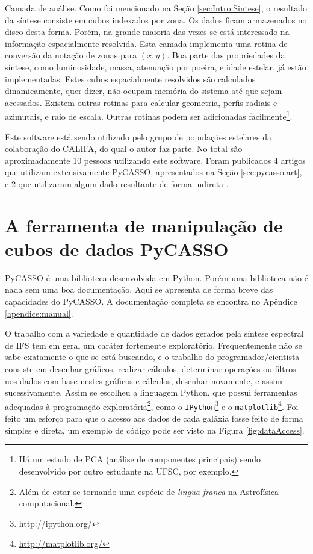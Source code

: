 Camada de análise. Como foi mencionado na Seção \ref{sec:Intro:Sintese}, o
resultado da síntese consiste em cubos indexados por zona. Os dados ficam
armazenados no disco desta forma. Porém, na grande maioria das vezes se está
interessado na informação espacialmente resolvida. Esta camada implementa uma rotina de
conversão da notação de zonas para $(x, y)$. Boa parte das propriedades da
síntese, como luminosidade, massa, atenuação por poeira, e idade estelar, já
estão implementadas. Estes cubos espacialmente resolvidos são calculados
dinamicamente, quer dizer, não ocupam memória do sistema até que sejam
acessados. Existem outras rotinas para calcular geometria, perfis radiais e
azimutais, e raio de escala. Outras rotinas podem ser adicionadas
facilmente\footnote{Há um estudo de PCA (análise de componentes principais)
sendo desenvolvido por outro estudante na UFSC, por exemplo.}.

Este software está sendo utilizado pelo grupo de populações estelares da
colaboração do CALIFA, do qual o autor faz parte. No total são aproximadamente
10 pessoas utilizando este software. Foram publicados 4 artigos que utilizam
extensivamente PyCASSO, apresentados na Seção \ref{sec:pycasso:art}, e 2 que
utilizaram algum dado resultante de forma indireta \citep{Husemann2013,
IglesiasParamo2013}.



\section{A ferramenta de manipulação de cubos de dados PyCASSO}
\label{sec:pycasso:Pycasso}

PyCASSO é uma biblioteca desenvolvida em Python. Porém uma biblioteca não é nada
sem uma boa documentação. Aqui se apresenta de forma breve das capacidades do
PyCASSO. A documentação completa se encontra no Apêndice \ref{apendice:manual}.

O trabalho com a variedade e quantidade de dados gerados pela síntese espectral
de IFS tem em geral um caráter fortemente exploratório. Frequentemente não se
sabe exatamente o que se está buscando, e o trabalho do programador/cientista
consiste em desenhar gráficos, realizar cálculos, determinar operações ou
filtros nos dados com base nestes gráficos e cálculos, desenhar novamente, e
assim sucessivamente. Assim se escolheu a linguagem Python, que possui
ferramentas adequadas à programação exploratória\footnote{Além de estar se
tornando uma espécie de {\em lingua franca} na Astrofísica computacional.}, como
o \texttt{IPython}\footnote{\url{http://ipython.org/}} e o
\texttt{matplotlib}\footnote{\url{http://matplotlib.org/}}. Foi feito um esforço
para que o acesso aos dados de cada galáxia fosse feito de forma simples e
direta, um exemplo de código pode ser visto na Figura \ref{fig:dataAccess}.

